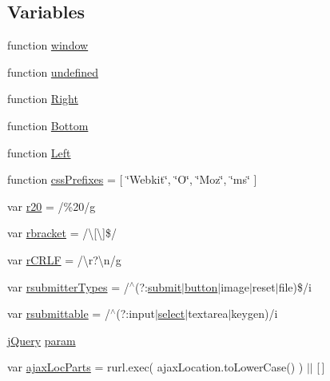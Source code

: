 \subsection*{Variables}
\begin{DoxyCompactItemize}
\item 
function \hyperlink{jquery-1_810_82_8js_a04a8a2bbfa9c15500892b8e5033d625b}{window}
\item 
function \hyperlink{jquery-1_810_82_8js_a08113a236cc18d2a9d5ce27e638012be}{undefined}
\item 
function \hyperlink{jquery-1_810_82_8js_ac7f66efc33d974809d85fc5bdb00c6eb}{Right}
\item 
function \hyperlink{jquery-1_810_82_8js_aff76c1cba4a00c678dfce0e0c5a5538a}{Bottom}
\item 
function \hyperlink{jquery-1_810_82_8js_abef68bf244a1159a49fe3a2c153a65d2}{Left}
\item 
function \hyperlink{jquery-1_810_82_8js_a2ed3892172b336458b8074254f4471da}{css\-Prefixes} = \mbox{[} \char`\"{}Webkit\char`\"{}, \char`\"{}O\char`\"{}, \char`\"{}Moz\char`\"{}, \char`\"{}ms\char`\"{} \mbox{]}
\item 
var \hyperlink{jquery-1_810_82_8js_a0e39f72d512af99fb5992d66f1a1c821}{r20} = /\%20/g
\item 
var \hyperlink{jquery-1_810_82_8js_a07117e28ee58d2d2664cfbaf741e10c1}{rbracket} = /\textbackslash{}\mbox{[}\textbackslash{}\mbox{]}\$/
\item 
var \hyperlink{jquery-1_810_82_8js_a4fd9dfc4eb645b441a3e84730c50154b}{r\-C\-R\-L\-F} = /\textbackslash{}r?\textbackslash{}n/g
\item 
var \hyperlink{jquery-1_810_82_8js_a0e9cd4ca08945afe827846f34a36c74a}{rsubmitter\-Types} = /$^\wedge$(?\-:\hyperlink{jquery-1_810_82-vsdoc_8js_a58af54f4f7137a051db7e3e27bdfe1b5}{submit}$\vert$\hyperlink{bootstrap_8min_8js_a55e170814e74f6c3db8ae9ea3ba9054f}{button}$\vert$image$\vert$reset$\vert$file)\$/i
\item 
var \hyperlink{jquery-1_810_82_8js_a12d248d7e6c5985c5ea21f56fbef9e90}{rsubmittable} = /$^\wedge$(?\-:input$\vert$\hyperlink{jquery-1_810_82-vsdoc_8js_a861f73402c6bb8457b04e4c36686ce8c}{select}$\vert$textarea$\vert$keygen)/i
\item 
\hyperlink{jquery-1_810_82_8js_a5e01048fbd3a30b44e8d491d8945c457}{j\-Query} \hyperlink{jquery-1_810_82_8js_a24ced9cd3c9e1970a8cbe8d7adedc765}{param}
\item 
var \hyperlink{jquery-1_810_82_8js_a4c35110da3c335cfca38505ee65a5e79}{ajax\-Loc\-Parts} = rurl.\-exec( ajax\-Location.\-to\-Lower\-Case() ) $\vert$$\vert$ \mbox{[}$\,$\mbox{]}
$$
\end{DoxyCompactItemize}

